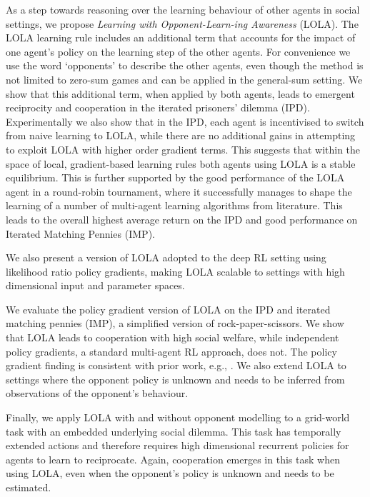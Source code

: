 As a step towards reasoning over the learning behaviour of other agents in social settings, we propose \emph{Learning with Opponent-Learn-ing Awareness} (LOLA). The LOLA learning rule includes an additional term that accounts for the impact of one agent's policy on the learning step of the other agents. For convenience we use the word `opponents' to describe the other agents, even though the method is not limited to zero-sum games and can be applied in the general-sum setting. We show that this additional term, when applied by both agents, leads to emergent reciprocity and cooperation in the iterated prisoners' dilemma (IPD). Experimentally we also show that in the IPD, each agent is incentivised to switch from naive learning to LOLA, while there are no additional gains in attempting to exploit LOLA with higher order gradient terms. This suggests that within the space of local, gradient-based learning rules both agents using LOLA is a stable equilibrium. This is further supported by the good performance of the LOLA agent in a round-robin tournament, where it successfully manages to shape the learning of a number of multi-agent learning algorithms from literature. This leads to the overall highest average return on the IPD and good performance on Iterated Matching Pennies (IMP). 

We also present a version of LOLA adopted to the deep RL setting using likelihood ratio policy gradients, making LOLA scalable to settings with high dimensional input and parameter spaces. 

We evaluate the policy gradient version of LOLA on the IPD and iterated matching pennies (IMP), a simplified version of rock-paper-scissors. We show that LOLA leads to cooperation with high social welfare, while independent policy gradients, a standard multi-agent RL approach, does not. The policy gradient finding is consistent with prior work, e.g., \citet{sandholm1996multiagent}. 
We also extend LOLA to settings where the opponent policy is unknown and needs to be inferred from observations of the opponent's behaviour. 

Finally, we apply LOLA with and without opponent modelling to a grid-world task with an embedded underlying social dilemma. This task has temporally extended actions and therefore requires high dimensional recurrent policies  for agents to learn to reciprocate. Again, cooperation emerges in this task when using LOLA, even when the opponent's policy is unknown and needs to be estimated. 